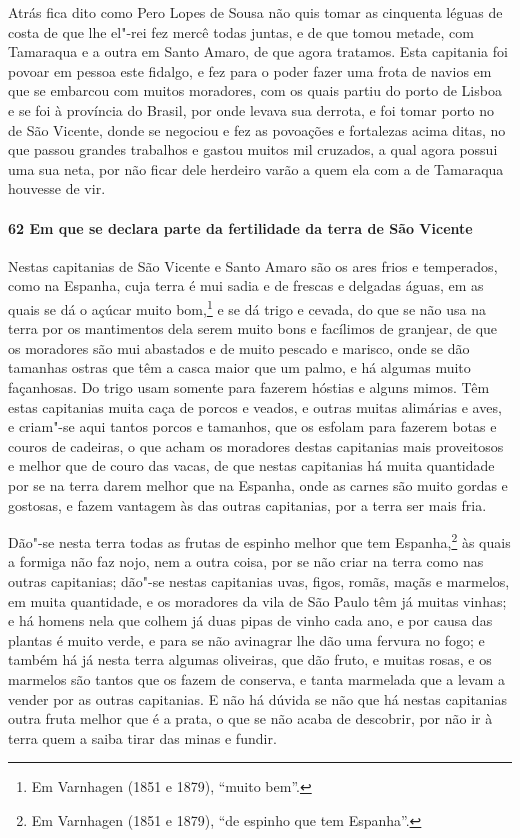 Atrás fica dito como Pero Lopes de Sousa não quis tomar as cinquenta léguas de costa de
que lhe el"-rei fez mercê todas juntas, e de que tomou metade, com Tamaraqua e a outra em
Santo Amaro, de que agora tratamos. Esta capitania foi povoar em pessoa este fidalgo, e
fez para o poder fazer uma frota de navios em que se embarcou com muitos moradores, com os
quais partiu do porto de Lisboa e se foi à província do Brasil, por onde levava sua
derrota, e foi tomar porto no de São Vicente, donde se negociou e fez as povoações e
fortalezas acima ditas, no que passou grandes trabalhos e gastou muitos mil cruzados, a
qual agora possui uma sua neta, por não ficar dele herdeiro varão a quem ela com a de
Tamaraqua houvesse de vir.

\paragraph{62 Em que se declara parte da fertilidade da terra de São Vicente}

Nestas capitanias de São Vicente e Santo Amaro são os ares frios e temperados, como na
Espanha, cuja terra é mui sadia e de frescas e delgadas águas, em as quais se dá o açúcar
muito bom,\footnote{ Em Varnhagen (1851 e 1879), ``muito bem''.} e se dá trigo e cevada,
do que se não usa na terra por os mantimentos dela serem muito bons e facílimos de
granjear, de que os moradores são mui abastados e de muito pescado e marisco, onde se dão
tamanhas ostras que têm a casca maior que um palmo, e há algumas muito façanhosas. Do
trigo usam somente para fazerem hóstias e alguns mimos. Têm estas capitanias muita caça de
porcos e veados, e outras muitas alimárias e aves, e criam"-se aqui tantos porcos e
tamanhos, que os esfolam para fazerem botas e couros de cadeiras, o que acham os moradores
destas capitanias mais proveitosos e melhor que de couro das vacas, de que nestas
capitanias há muita quantidade por se na terra darem melhor que na Espanha, onde as carnes
são muito gordas e gostosas, e fazem vantagem às das outras capitanias, por a terra ser
mais fria.

Dão"-se nesta terra todas as frutas de espinho melhor que tem Espanha,\footnote{ Em
Varnhagen (1851 e 1879), ``de espinho que tem Espanha''.} às quais a formiga não faz nojo,
nem a outra coisa, por se não criar na terra como nas outras capitanias; dão"-se nestas
capitanias uvas, figos, romãs, maçãs e marmelos, em muita quantidade, e os moradores da
vila de São Paulo têm já muitas vinhas; e há homens nela que colhem já duas pipas de vinho
cada ano, e por causa das plantas é muito verde, e para se não avinagrar lhe dão uma
fervura no fogo; e também há já nesta terra algumas oliveiras, que dão fruto, e muitas
rosas, e os marmelos são tantos que os fazem de conserva, e tanta marmelada que a levam a
vender por as outras capitanias. E não há dúvida se não que há nestas capitanias outra
fruta melhor que é a prata, o que se não acaba de descobrir, por não ir à terra quem a
saiba tirar das minas e fundir.

